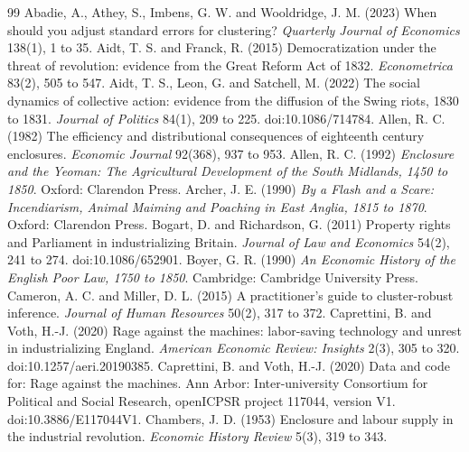 \documentclass[11pt,a4paper]{article}
\begin{document}
\begin{thebibliography}{99}\small
{} Abadie, A., Athey, S., Imbens, G. W. and Wooldridge, J. M. (2023) When should you adjust standard errors for clustering? \textit{Quarterly Journal of Economics} 138(1), 1 to 35.
 Aidt, T. S. and Franck, R. (2015) Democratization under the threat of revolution: evidence from the Great Reform Act of 1832. \textit{Econometrica} 83(2), 505 to 547.
 Aidt, T. S., Leon, G. and Satchell, M. (2022) The social dynamics of collective action: evidence from the diffusion of the Swing riots, 1830 to 1831. \textit{Journal of Politics} 84(1), 209 to 225. doi:10.1086/714784.
 Allen, R. C. (1982) The efficiency and distributional consequences of eighteenth century enclosures. \textit{Economic Journal} 92(368), 937 to 953.
 Allen, R. C. (1992) \textit{Enclosure and the Yeoman: The Agricultural Development of the South Midlands, 1450 to 1850}. Oxford: Clarendon Press.
 Archer, J. E. (1990) \textit{By a Flash and a Scare: Incendiarism, Animal Maiming and Poaching in East Anglia, 1815 to 1870}. Oxford: Clarendon Press.
 Bogart, D. and Richardson, G. (2011) Property rights and Parliament in industrializing Britain. \textit{Journal of Law and Economics} 54(2), 241 to 274. doi:10.1086/652901.
 Boyer, G. R. (1990) \textit{An Economic History of the English Poor Law, 1750 to 1850}. Cambridge: Cambridge University Press.
 Cameron, A. C. and Miller, D. L. (2015) A practitioner's guide to cluster-robust inference. \textit{Journal of Human Resources} 50(2), 317 to 372.
 Caprettini, B. and Voth, H.-J. (2020) Rage against the machines: labor-saving technology and unrest in industrializing England. \textit{American Economic Review: Insights} 2(3), 305 to 320. doi:10.1257/aeri.20190385.
 Caprettini, B. and Voth, H.-J. (2020) Data and code for: Rage against the machines. Ann Arbor: Inter-university Consortium for Political and Social Research, openICPSR project 117044, version V1. doi:10.3886/E117044V1.
 Chambers, J. D. (1953) Enclosure and labour supply in the industrial revolution. \textit{Economic History Review} 5(3), 319 to 343.

\end{thebibliography}
\end{document}
